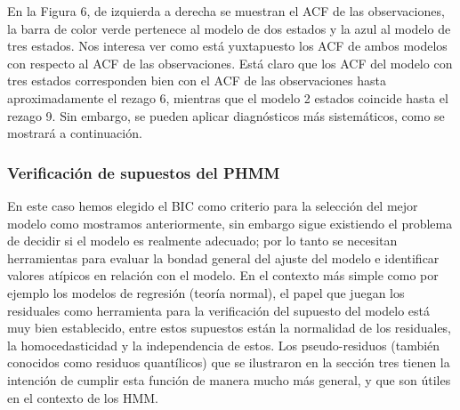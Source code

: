 \documentclass[a4paper]{article}\usepackage[]{graphicx}\usepackage[]{color}
\begin{document}
En la Figura 6, de izquierda a derecha se muestran el ACF de las observaciones, la barra de color verde pertenece al modelo de dos estados y la azul al modelo de tres estados. Nos interesa ver como está yuxtapuesto los ACF de ambos modelos con respecto al ACF de las observaciones. Está claro que los ACF del modelo con tres estados corresponden bien con el ACF de las observaciones hasta aproximadamente el rezago 6, mientras que el modelo 2 estados coincide hasta el rezago 9. Sin embargo, se pueden aplicar diagnósticos más sistemáticos, como se mostrará a continuación.

\subsubsection*{Verificación de supuestos del PHMM}

En este caso hemos elegido el BIC como criterio para la selección del mejor modelo como mostramos anteriormente, sin embargo sigue existiendo el problema de decidir si el modelo es realmente adecuado; por lo tanto se necesitan herramientas para evaluar la bondad general del ajuste del modelo e identificar valores atípicos en relación con el modelo. En el contexto más simple como por ejemplo los modelos de regresión (teoría normal), el papel que juegan los residuales como herramienta para la verificación del supuesto del modelo está muy bien establecido, entre estos supuestos están la normalidad de los residuales, la homocedasticidad y la independencia de estos. Los pseudo-residuos (también conocidos como residuos quantílicos) que se ilustraron en la sección tres tienen la intención de cumplir esta función de manera mucho más general, y que son útiles en el contexto de los HMM. 
\end{document}

